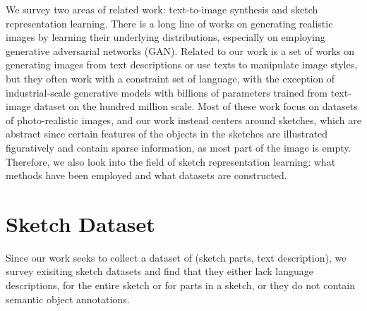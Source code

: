 
We survey two areas of related work:  text-to-image synthesis and sketch representation learning. There is a long line of works on generating realistic images by learning their underlying distributions, especially on employing generative adversarial networks (GAN). 
Related to our work is a set of works on generating images from text descriptions or use texts to manipulate image styles, but they often work with a constraint set of language, with the exception of industrial-scale generative models with billions of parameters trained from text-image dataset on the hundred million scale. %
Most of these work focus on datasets of photo-realistic images, and our work instead centers around sketches, which are abstract since certain features of the objects in the sketches are illustrated figuratively and contain sparse information, as most part of the image is empty. 
Therefore, we also look into the field of sketch representation learning: what methods have been employed and what datasets are constructed.   




\section{Sketch Dataset} \label{related.sketch.datasets}
Since our work seeks to collect a dataset of (sketch parts, text description), we survey exisiting sketch datasets and find that they either lack language descriptions, for the entire sketch or for parts in a sketch, or they do not contain semantic object annotations. 

